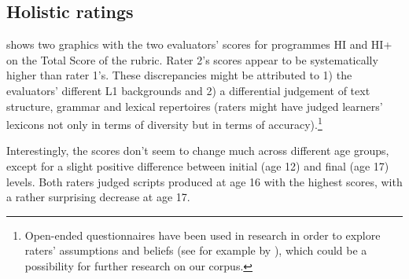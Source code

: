 \documentclass[output=paper]{langsci/langscibook}
\begin{document}
\subsection{Holistic ratings}

 shows two graphics with the two evaluators’ scores for programmes HI and HI+ on the Total Score of the rubric. Rater 2’s scores appear to be systematically higher than rater 1’s. These discrepancies might be attributed to 1) the evaluators’ different L1 backgrounds and 2) a differential judgement of text structure, grammar and lexical repertoires (raters might have judged learners’ lexicons not only in terms of diversity but in terms of accuracy).\footnote{Open-ended questionnaires have been used in  research in order to explore raters’ assumptions and beliefs (see for example by ), which could be a possibility for further research on our corpus.}  

Interestingly, the scores don’t seem to change much across different age groups, except for a slight positive difference between initial (age 12) and final (age 17) levels. Both raters judged scripts produced at age 16 with the highest scores, with a rather surprising decrease at age 17. 
\end{document}

